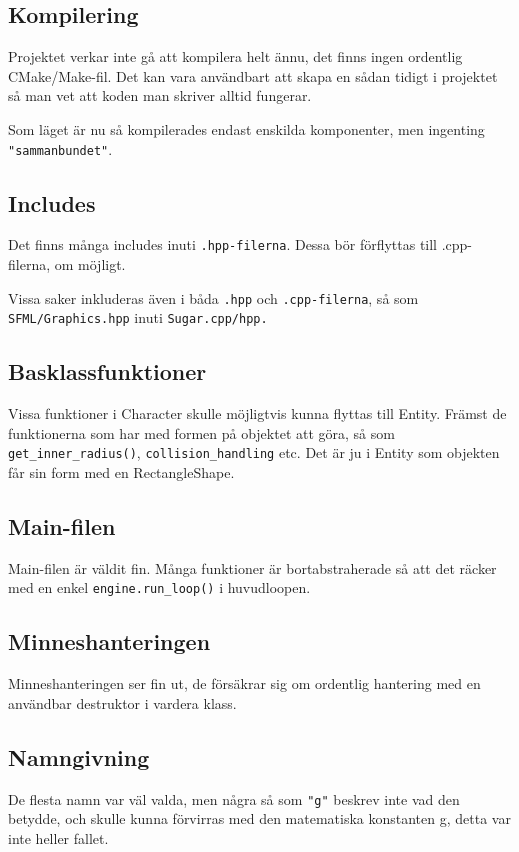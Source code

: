 \documentclass{TDP005mall}
\begin{document}
\subsection{Kompilering}
Projektet verkar inte gå att kompilera helt ännu, det finns ingen ordentlig CMake/Make-fil. Det kan vara användbart att skapa en sådan tidigt i projektet så man vet att koden man skriver alltid fungerar.

Som läget är nu så kompilerades endast enskilda komponenter, men ingenting \verb|"sammanbundet"|.

\subsection{Includes}
Det finns många includes inuti \verb|.hpp-filerna|. Dessa bör förflyttas till .cpp-filerna, om möjligt.

Vissa saker inkluderas även i båda \verb|.hpp| och \verb|.cpp-filerna|, så som \verb|SFML/Graphics.hpp| inuti \verb|Sugar.cpp/hpp.|

\subsection{Basklassfunktioner}
Vissa funktioner i Character skulle möjligtvis kunna flyttas till Entity. Främst de funktionerna som har med formen på objektet att göra, så som \verb|get_inner_radius()|, \verb|collision_handling| etc. Det är ju i Entity som objekten får sin form med en RectangleShape.

\subsection{Main-filen}
Main-filen är väldit fin. Många funktioner är bortabstraherade så att det räcker med en enkel \verb|engine.run_loop()| i huvudloopen.

\subsection{Minneshanteringen}
Minneshanteringen ser fin ut, de försäkrar sig om ordentlig hantering med en användbar destruktor i vardera klass.

\subsection{Namngivning}
De flesta namn var väl valda, men några så som \verb|"g"| beskrev inte vad den betydde, och skulle kunna förvirras med den matematiska konstanten g, detta var inte heller fallet.
\end{document}
